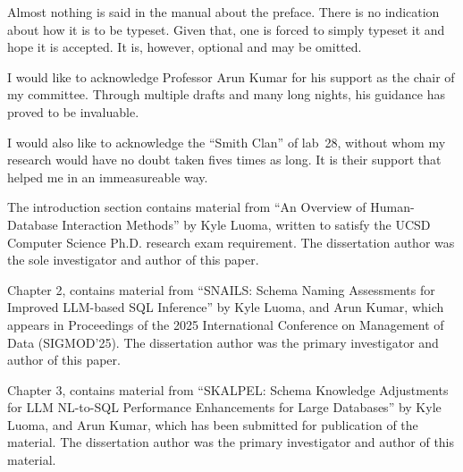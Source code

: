 \documentclass[12pt]{ucsddissertation}
\begin{document}
\tableofcontents
\listoffigures
\listoftables

\begin{preface}
Almost nothing is said in the manual about the preface. There is no
indication about how it is to be typeset. Given that, one is forced to
simply typeset it and hope it is accepted. It is, however, optional
and may be omitted.
\end{preface}

\begin{acknowledgements}
I would like to acknowledge Professor Arun Kumar for his support as the
chair of my committee. Through multiple drafts and many long nights,
his guidance has proved to be invaluable.

I would also like to acknowledge the ``Smith Clan'' of lab~28, without
whom my research would have no doubt taken fives times as long. It is
their support that helped me in an immeasureable way.

The introduction section contains material from ``An Overview of Human-Database Interaction Methods'' by Kyle Luoma, written to satisfy the UCSD Computer Science Ph.D. research exam requirement. The dissertation author was the sole investigator and author of this paper.

Chapter 2, contains material from ``SNAILS: Schema Naming Assessments for Improved LLM-based SQL Inference'' by Kyle Luoma, and Arun Kumar, which appears in Proceedings of the 2025 International Conference on Management of Data (SIGMOD'25). The dissertation author was the primary investigator and author of this paper.

Chapter 3, contains material from ``SKALPEL: Schema Knowledge Adjustments for LLM NL-to-SQL Performance Enhancements for Large Databases'' by Kyle Luoma, and Arun Kumar, which has been submitted for publication of the material. The dissertation author was the primary investigator and author of this material.
\end{acknowledgements}
\end{document}
